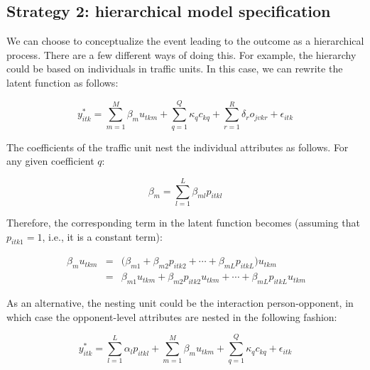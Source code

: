 \documentclass[]{elsarticle} %
\begin{document}
\hypertarget{strategy-2-hierarchical-model-specification}{%
\subsection{Strategy 2: hierarchical model
specification}\label{strategy-2-hierarchical-model-specification}}

We can choose to conceptualize the event leading to the outcome as a
hierarchical process. There are a few different ways of doing this. For
example, the hierarchy could be based on individuals in traffic units.
In this case, we can rewrite the latent function as follows:

\begin{equation}
\label{eq:latent-function-with-hierarchical-traffic-unit}
y_{itk}^*=\sum_{m=1}^M\beta_mu_{tkm} + \sum_{q=1}^Q\kappa_qc_{kq} + \sum_{r=1}^R\delta_ro_{jvkr} + \epsilon_{itk}
\end{equation}

The coefficients of the traffic unit nest the individual attributes as
follows. For any given coefficient \(q\):

\begin{equation}
\label{eq:hierarchical-traffic-unit-coefficients}
\beta_{m}=\sum_{l=1}^L\beta_{ml}p_{itkl} 
\end{equation}

Therefore, the corresponding term in the latent function becomes
(assuming that \(p_{itk1} = 1\), i.e., it is a constant term):

\begin{equation}
\label{eq:hierarchical-traffic-unit-coefficients}
\begin{array}{rcl}\
\beta_{m}u_{tkm} &=& \big( \beta_{m1} + \beta_{m2}p_{itk2} + \cdots + \beta_{mL}p_{itkL}\big)u_{tkm}\\ 
&=& \beta_{m1}u_{tkm} + \beta_{m2}p_{itk2}u_{tkm} + \cdots + \beta_{mL}p_{itkL}u_{tkm}
\end{array}
\end{equation}

As an alternative, the nesting unit could be the interaction
person-opponent, in which case the opponent-level attributes are nested
in the following fashion:

\begin{equation}
\label{eq:latent-function-with-opponent-variables}
y_{itk}^*=\sum_{l=1}^L\alpha_lp_{itkl} + \sum_{m=1}^M\beta_mu_{tkm} + \sum_{q=1}^Q\kappa_qc_{kq} + \epsilon_{itk}
\end{equation}
\end{document}
